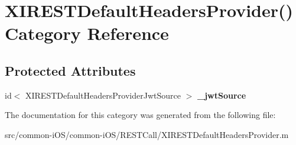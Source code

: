 \hypertarget{category_x_i_r_e_s_t_default_headers_provider_07_08}{}\section{X\+I\+R\+E\+S\+T\+Default\+Headers\+Provider() Category Reference}
\label{category_x_i_r_e_s_t_default_headers_provider_07_08}
\subsection*{Protected Attributes}
\begin{DoxyCompactItemize}
\item 
\hypertarget{category_x_i_r_e_s_t_default_headers_provider_07_08_a6e81fec1b85c3786f96863a749593e97}{}\label{category_x_i_r_e_s_t_default_headers_provider_07_08_a6e81fec1b85c3786f96863a749593e97} 
id$<$ X\+I\+R\+E\+S\+T\+Default\+Headers\+Provider\+Jwt\+Source $>$ {\bfseries \+\_\+jwt\+Source}
\end{DoxyCompactItemize}


The documentation for this category was generated from the following file\+:\begin{DoxyCompactItemize}
\item 
src/common-\/i\+O\+S/common-\/i\+O\+S/\+R\+E\+S\+T\+Call/X\+I\+R\+E\+S\+T\+Default\+Headers\+Provider.\+m\end{DoxyCompactItemize}
